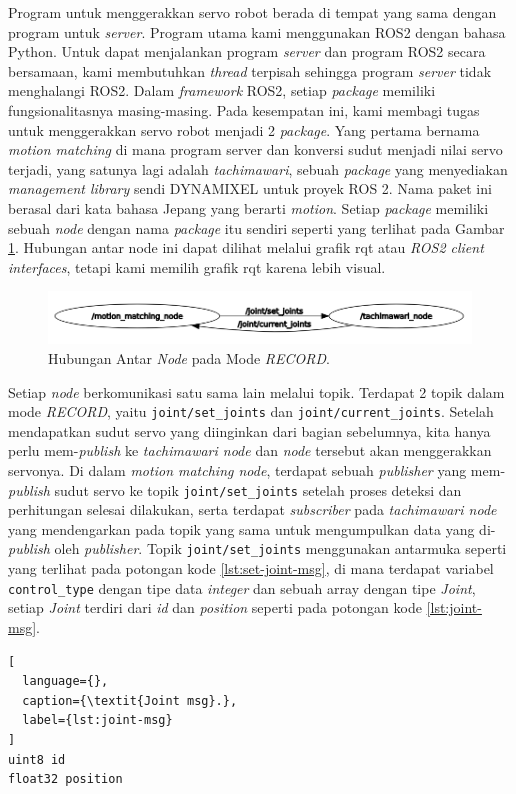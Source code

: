 Program untuk menggerakkan servo robot berada di tempat yang sama dengan program untuk \textit{server}. Program utama kami menggunakan ROS2 dengan bahasa Python. Untuk dapat menjalankan program \textit{server} dan program ROS2 secara bersamaan, kami membutuhkan \textit{thread} terpisah sehingga program \textit{server} tidak menghalangi ROS2.
Dalam \textit{framework} ROS2, setiap \textit{package} memiliki fungsionalitasnya masing-masing. Pada kesempatan ini, kami membagi tugas untuk menggerakkan servo robot menjadi 2 \textit{package}. Yang pertama bernama \emph{motion matching} di mana program server dan konversi sudut menjadi nilai servo terjadi, yang satunya lagi adalah \emph{tachimawari}, sebuah \textit{package} yang menyediakan \textit{management library} sendi DYNAMIXEL untuk proyek ROS 2.
Nama paket ini berasal dari kata bahasa Jepang yang berarti \textit{motion}. Setiap \textit{package} memiliki sebuah \textit{node} dengan nama \textit{package} itu sendiri seperti yang terlihat pada Gambar \ref{fig:relation-node-record-mode}.
Hubungan antar node ini dapat dilihat melalui grafik rqt atau \textit{ROS2 client interfaces}, tetapi kami memilih grafik rqt karena lebih visual.
\begin{figure}[ht]
  \centering
  \includegraphics[scale=0.62]{gambar/rqt_without_akushon.png}
  \caption{Hubungan Antar \textit{Node} pada Mode \textit{RECORD}.}
  \label{fig:relation-node-record-mode}
\end{figure}

Setiap \textit{node} berkomunikasi satu sama lain melalui topik. Terdapat 2 topik dalam mode \textit{RECORD}, yaitu \verb|joint/set_joints| dan \verb|joint/current_joints|.
Setelah mendapatkan sudut servo yang diinginkan dari bagian sebelumnya, kita hanya perlu mem-\textit{publish} ke \emph{tachimawari node} dan \textit{node} tersebut akan menggerakkan servonya. Di dalam \emph{motion matching node}, terdapat sebuah \emph{publisher} yang mem-\textit{publish} sudut servo ke topik \verb|joint/set_joints| setelah proses deteksi dan
perhitungan selesai dilakukan, serta terdapat \emph{subscriber} pada \emph{tachimawari node} yang mendengarkan pada topik yang sama untuk mengumpulkan data yang di-\textit{publish} oleh \emph{publisher}. Topik \verb|joint/set_joints| menggunakan antarmuka seperti yang terlihat pada potongan kode \ref{lst:set-joint-msg}, di mana terdapat variabel \verb|control_type| dengan tipe data \textit{integer} dan sebuah array dengan tipe \textit{Joint}, setiap \textit{Joint} terdiri dari \textit{id} dan \textit{position} seperti pada potongan kode \ref{lst:joint-msg}.
\begin{lstlisting}[
  language={},
  caption={\textit{Joint msg}.},
  label={lst:joint-msg}
]
uint8 id
float32 position
\end{lstlisting}

